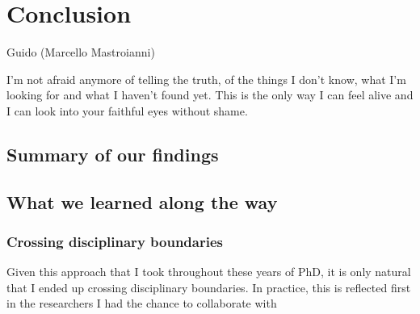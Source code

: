 \documentclass[../thesis.tex]{subfiles}
\begin{document}
\chapter{Conclusion}
\label{ch:conclusion}

\epigraph{
  \begin{center}
    \textnormal{Guido (Marcello Mastroianni)}\\
  \end{center}
  I'm not afraid anymore of telling the truth, of the things I don't know, what I'm
  looking for and what I haven't found yet. This is the only way I can feel alive and I
  can look into your faithful eyes without shame.
}{
}


\section{Summary of our findings}



\section{What we learned along the way}



\subsection{Crossing disciplinary boundaries}
Given this approach that I took throughout these years of PhD, it is only natural that I ended up crossing disciplinary boundaries. In practice, this is reflected first in the researchers I had the chance to collaborate with
\end{document}
